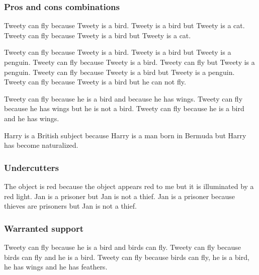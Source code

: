 \subsubsection{Pros and cons combinations}
\begin{exe}
\ex\label{e28} Tweety can fly because Tweety is a bird. Tweety is a bird but Tweety is a cat.
\ex\label{e29} Tweety can fly because Tweety is a bird but Tweety is a cat.
\end{exe}

\begin{exe}
\ex\label{e30} Tweety can fly because Tweety is a bird. Tweety is a bird but Tweety is a penguin.
\ex\label{e31} Tweety can fly because Tweety is a bird. Tweety can fly but Tweety is a penguin.
\ex\label{e32} Tweety can fly because Tweety is a bird but Tweety is a penguin.
\ex\label{e33} Tweety can fly because Tweety is a bird but he can not fly.
\end{exe}

\begin{exe}
\ex\label{e34} Tweety can fly because he is a bird and because he has wings.
\ex\label{e35} Tweety can fly because he has wings but he is not a bird.
\ex\label{e36} Tweety can fly because he is a bird and he has wings.
\end{exe}

\begin{exe}
\ex\label{e37} Harry is a British subject because Harry is a man born in Bermuda but Harry has become naturalized.
\end{exe}

\subsubsection{Undercutters}
\begin{exe}
\ex\label{e38} The object is red because the object appears red to me but it is illuminated by a red light.
\ex\label{e39} Jan is a prisoner but Jan is not a thief.
\ex\label{e40} Jan is a prisoner because thieves are prisoners but Jan is not a thief.
\end{exe}

\subsubsection{Warranted support}
\begin{exe}
\ex\label{e41} Tweety can fly because he is a bird and birds can fly.
\ex\label{e42} Tweety can fly because birds can fly and he is a bird.
\ex\label{e43} Tweety can fly because birds can fly, he is a bird, he has wings and he has feathers.
\end{exe}

